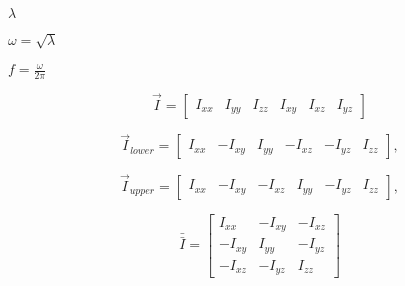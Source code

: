 \documentclass{article}
\begin{document}
$ \lambda$
\pagebreak

$ \omega = \sqrt{\lambda}$
\pagebreak

$ f = \frac{\omega}{2\pi}$
\pagebreak

\[ \vec{I} = \begin{bmatrix} I_{xx} & I_{yy} & I_{zz} & I_{xy} & I_{xz} & I_{yz} \end{bmatrix} \]
\pagebreak

\[ \vec{I}_{lower} = \begin{bmatrix} I_{xx} & -I_{xy} & I_{yy} & -I_{xz} & -I_{yz} & I_{zz} \end{bmatrix}, \]
\pagebreak

\[ \vec{I}_{upper} = \begin{bmatrix} I_{xx} & -I_{xy} & -I_{xz} & I_{yy} & -I_{yz} & I_{zz} \end{bmatrix}, \]
\pagebreak

\[ \bar{\bar{I}} = \begin{bmatrix} I_{xx} & -I_{xy} & -I_{xz} \\ -I_{xy} & I_{yy} & -I_{yz} \\ -I_{xz} & -I_{yz} & I_{zz} \end{bmatrix} \]
\pagebreak
\end{document}
